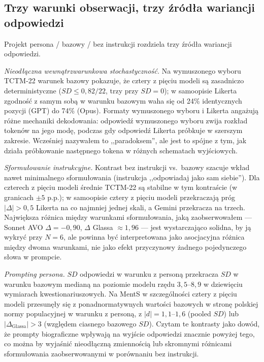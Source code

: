 \documentclass[11pt,a4paper]{article}
\begin{document}
\subsection{Trzy warunki obserwacji, trzy źródła wariancji odpowiedzi}

Projekt persona / bazowy / bez instrukcji rozdziela trzy źródła wariancji odpowiedzi.

\emph{Nieodłączna wewnątrzwarunkowa stochastyczność.} Na wymuszonego wyboru TCTM-22 warunek bazowy pokazuje, że cztery z pięciu modeli są zasadniczo deterministyczne ($SD \leq 0{,}82 / 22$, trzy przy $SD = 0$); w samoopisie Likerta zgodność z samym sobą w warunku bazowym waha się od 24\% identycznych pozycji (GPT) do 74\% (Opus). Formaty wymuszonego wyboru i Likerta angażują różne mechaniki dekodowania: odpowiedź wymuszonego wyboru zwija rozkład tokenów na jego modę, podczas gdy odpowiedź Likerta próbkuje w szerszym zakresie. Wcześniej nazywałem to ,,paradoksem'', ale jest to spójne z tym, jak działa próbkowanie następnego tokena w różnych schematach wyjściowych.

\emph{Sformułowanie instrukcyjne.} Kontrast bez instrukcji vs.\ bazowy szacuje wkład nawet minimalnego sformułowania (instrukcja ,,odpowiadaj jako sam siebie''). Dla czterech z pięciu modeli średnie TCTM-22 są stabilne w tym kontraście (w granicach $\pm 5$ p.p.); w samoopisie cztery z pięciu modeli przekraczają próg $|\Delta| > 0{,}5$ Likerta na co najmniej jednej skali, a Gemini przekracza na trzech. Największa różnica między warunkami sformułowania, jaką zaobserwowałem --- Sonnet AVO $\Delta = -0{,}90$, $\Delta$ Glassa $\approx 1{,}96$ --- jest wystarczająco solidna, by ją wykryć przy $N = 6$, ale powinna być interpretowana jako asocjacyjna różnica między dwoma warunkami, nie jako efekt przyczynowy żadnego pojedynczego słowa w prompcie.

\emph{Prompting persona.} $SD$ odpowiedzi w warunku z personą przekracza $SD$ w warunku bazowym medianą na poziomie modelu rzędu $3{,}5$--$8{,}9$ w dziewięciu wymiarach kwestionariuszowych. Na MentS w szczególności cztery z pięciu modeli przesunęły się z ponadnormatywnych wartości bazowych w stronę polskiej normy populacyjnej w warunku z personą, z $|d| = 1{,}1$--$1{,}6$ (pooled $SD$) lub $|\Delta_{\text{Glassa}}| > 3$ (względem ciasnego bazowego $SD$). Czytam te kontrasty jako dowód, że prompty biograficzne wpływają na wyjście odpowiedzi znacznie powyżej tego, co można by wyjaśnić nieodłączną zmiennością lub skromnymi różnicami sformułowania zaobserwowanymi w porównaniu bez instrukcji.
\end{document}
